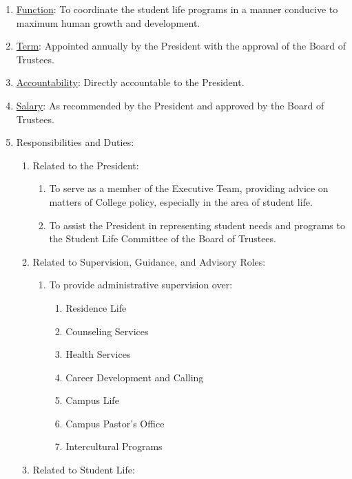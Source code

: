 \documentclass[letterpaper, 11pt]{article}
\begin{document}
					\begin{enumerate}[label=\alph*)]
						\item{\underline{Function}: To coordinate the student life programs in a manner conducive to maximum human growth and development.}
						\item{\underline{Term}: Appointed annually by the President with the approval of the Board of Trustees.}
						\item{\underline{Accountability}: Directly accountable to the President.}
						\item{\underline{Salary}: As recommended by the President and approved by the Board of Trustees.}
						\item{Responsibilities and Duties:
							\begin{enumerate}[label=\arabic*)]
								\item{Related to the President:
									\begin{enumerate}[label=(\alph*)]
										\item{To serve as a member of the Executive Team, providing advice on matters of College policy, especially in the area of student life.}
										\item{To assist the President in representing student needs and programs to the Student Life Committee of the Board of Trustees.}
									\end{enumerate}
								}
								\item{Related to Supervision, Guidance, and Advisory Roles:
									\begin{enumerate}[label=(\alph*)]
										\item{To provide administrative supervision over:
											\begin{enumerate}[label=(\arabic*)]
												\item{Residence Life}
												\item{Counseling Services}
												\item{Health Services}
												\item{Career Development and Calling}
												\item{Campus Life}
												\item{Campus Pastor's Office}
												\item{Intercultural Programs}
											\end{enumerate}
										}
									\end{enumerate}
								}
								\item{Related to Student Life:
}
\end{enumerate}}
\end{enumerate}
\end{document}
